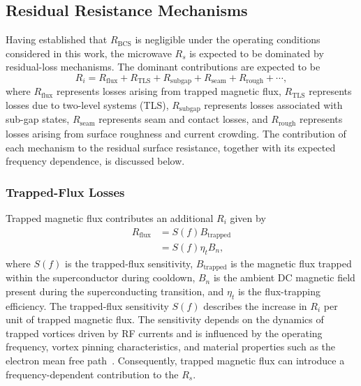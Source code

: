 \documentclass[
  aps,
  physrev,
  reprint,
  superscriptaddress,
  nofootinbib,
  amsmath,
  amssymb
]{revtex4-2}
\begin{document}
\subsection[\appendixname~\thesubsection]{Residual Resistance Mechanisms}
\label{app:Rs_residual}

Having established that $R_{\mathrm{BCS}}$ is negligible under the operating conditions considered in this work, the microwave $R_s$ is expected to be dominated by residual-loss mechanisms. The dominant contributions are expected to be
\begin{equation}
    R_i
    =
    R_{\mathrm{flux}}
    +
    R_{\mathrm{TLS}}
    +
    R_{\mathrm{subgap}}
    +
    R_{\mathrm{seam}}
    +
    R_{\mathrm{rough}}
    + \cdots,
    \label{eq:residual_decomp}
\end{equation}
where $R_{\mathrm{flux}}$ represents losses arising from trapped magnetic flux, $R_{\mathrm{TLS}}$ represents losses due to two-level systems (TLS), $R_{\mathrm{subgap}}$ represents losses associated with sub-gap states, $R_{\mathrm{seam}}$ represents seam and contact losses, and $R_{\mathrm{rough}}$ represents losses arising from surface roughness and current crowding. The contribution of each mechanism to the residual surface resistance, together with its expected frequency dependence, is discussed below.

\subsubsection[\appendixname~\thesubsubsection]{Trapped-Flux Losses}
\label{app:Rs_flux}

Trapped magnetic flux contributes an additional $R_i$ given by~\cite{Dhakal2020}
\begin{equation}
    \begin{aligned}
        R_{\mathrm{flux}}
        &=
        S(f)B_{\mathrm{trapped}} \\
        &=
        S(f)\eta_tB_n,
    \end{aligned}
    \label{eq:flux_loss}
\end{equation}
where $S(f)$ is the trapped-flux sensitivity, $B_{\mathrm{trapped}}$ is the magnetic flux trapped within the superconductor during cooldown, $B_n$ is the ambient DC magnetic field present during the superconducting transition, and $\eta_t$ is the flux-trapping efficiency. The trapped-flux sensitivity $S(f)$ describes the increase in $R_i$ per unit of trapped magnetic flux. The sensitivity depends on the dynamics of trapped vortices driven by RF currents and is influenced by the operating frequency, vortex pinning characteristics, and material properties such as the electron mean free path~\cite{Dhakal2020}. Consequently, trapped magnetic flux can introduce a frequency-dependent contribution to the $R_s$. 
\end{document}
